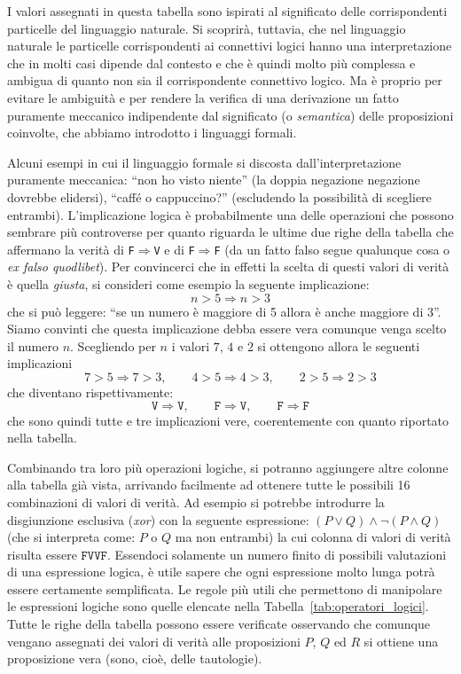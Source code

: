 \documentclass[italian,a4paper,hidelinks]{scrartcl}
\newcommand{\myemph}[1]{\emph{#1}\marginpar{#1}}
\begin{document}
I valori assegnati in questa tabella sono ispirati al significato
delle corrispondenti particelle del linguaggio naturale. Si scoprirà,
tuttavia, che nel linguaggio naturale le particelle corrispondenti ai
connettivi logici hanno una interpretazione che in molti casi dipende
dal contesto e che è quindi molto più complessa e ambigua di quanto
non sia il corrispondente connettivo logico. Ma è proprio per evitare
le ambiguità e per rendere la verifica di una derivazione un fatto
puramente meccanico indipendente dal significato (o \myemph{semantica})
delle proposizioni coinvolte, che abbiamo introdotto i linguaggi
formali.

Alcuni esempi in cui il linguaggio formale si discosta
dall'interpretazione puramente meccanica: ``non ho visto niente''
(la doppia negazione negazione dovrebbe elidersi), ``caffé o cappuccino?''
(escludendo la possibilità di scegliere entrambi). L'implicazione
logica è probabilmente una delle operazioni che possono sembrare più
controverse per quanto riguarda le ultime due righe della tabella che
affermano la verità di \texttt{F}$\Rightarrow$\texttt{V} e di
\texttt{F}$\Rightarrow$\texttt{F} (da un fatto falso segue qualunque
cosa o \emph{ex falso quodlibet}). Per convincerci che in effetti la
scelta di questi valori di verità è quella \emph{giusta}, si consideri
come esempio
la seguente implicazione:
\[
n > 5 \Rightarrow n > 3
\]
che si può leggere: ``se un numero è maggiore di 5 allora è anche
maggiore di 3''. Siamo convinti che questa implicazione debba essere vera comunque
venga scelto il numero $n$. Scegliendo per $n$ i valori $7$, $4$ e $2$
si ottengono allora le seguenti implicazioni
\[
7 > 5 \Rightarrow 7>3, \qquad 4>5 \Rightarrow 4 > 3, \qquad 2>5
\Rightarrow 2>3
\]
che diventano rispettivamente:
\[
\texttt{V} \Rightarrow \texttt{V}, \qquad
\texttt{F} \Rightarrow \texttt{V}, \qquad
\texttt{F} \Rightarrow \texttt{F}
\]
che sono quindi tutte e tre implicazioni vere, coerentemente con
quanto riportato nella tabella.

Combinando tra loro più operazioni logiche, si potranno
aggiungere altre colonne alla tabella già vista, arrivando facilmente
ad ottenere tutte le possibili 16 combinazioni di valori di verità. Ad
esempio si potrebbe introdurre la disgiunzione esclusiva (\emph{xor})
con la seguente espressione: $(P \lor Q) \land \neg (P\land Q)$ (che
si interpreta come: $P$ o $Q$ ma non entrambi) la cui colonna di
valori di verità risulta essere $\texttt{FVVF}$. Essendoci solamente
un numero finito di possibili valutazioni di una espressione logica, è
utile sapere che ogni espressione molto lunga potrà essere certamente
semplificata. Le regole più utili che permettono di manipolare le
espressioni logiche sono quelle elencate nella Tabella~\ref{tab:operatori_logici}.
Tutte le righe della tabella possono essere verificate
osservando che comunque vengano assegnati dei valori di verità alle proposizioni
$P$, $Q$ ed $R$ si ottiene una proposizione vera (sono, cioè, delle tautologie).
\end{document}
